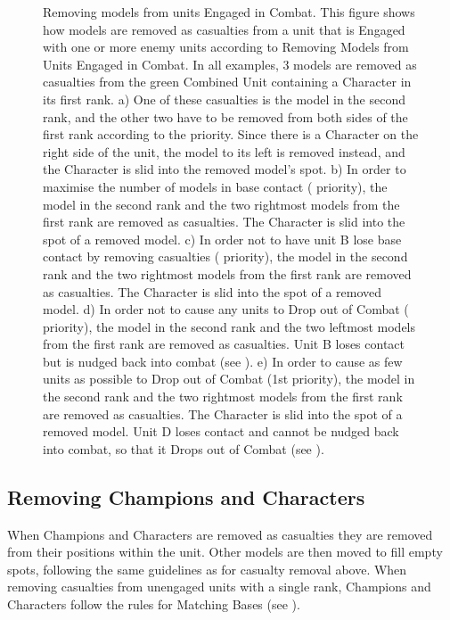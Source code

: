 \newcommand{\figRRMChar}{\fontsize{7}{8}\selectfont C}

\begin{figure}[!htbp]
	\renewcommand{\figbiglettersize}{16}
	\centering
	\begin{minipage}{0.55\textwidth}
	\def\svgwidth{\textwidth}
	
	\end{minipage}\hfill\begin{minipage}{0.43\textwidth}
	\caption{Removing \rnf{} models from units Engaged in Combat.\captionpar
	This figure shows how models are removed as casualties from a unit that is Engaged with one or more enemy units according to Removing \rnf{} Models from Units Engaged in Combat. In all examples, 3 models are removed as casualties from the green Combined Unit containing a Character in its first rank.\captionpar
	a) One of these casualties is the model in the second rank, and the other two have to be removed from both sides of the first rank according to the  priority. Since there is a Character on the right side of the unit, the \rnf{} model to its left is removed instead, and the Character is slid into the removed model's spot.\captionpar
	b) In order to maximise the number of models in base contact ( priority), the model in the second rank and the two rightmost \rnf{} models from the first rank are removed as casualties. The Character is slid into the spot of a removed \rnf{} model.\captionpar
	c) In order not to have unit B lose base contact by removing casualties ( priority), the model in the second rank and the two rightmost \rnf{} models from the first rank are removed as casualties. The Character is slid into the spot of a removed \rnf{} model.\captionpar
	d) In order not to cause any units to Drop out of Combat ( priority), the model in the second rank and the two leftmost \rnf{} models from the first rank are removed as casualties. Unit B loses contact but is nudged back into combat (see ).\captionpar
	e) In order to cause as few units as possible to Drop out of Combat (1st priority), the model in the second rank and the two rightmost \rnf{} models from the first rank are removed as casualties. The Character is slid into the spot of a removed \rnf{} model. Unit D loses contact and cannot be nudged back into combat, so that it Drops out of Combat (see ).\captionpar
	}
	\label{figure/removing_rnf_models}
	\end{minipage}
\end{figure}

 \subsection{Removing Champions and Characters}
 \label{removing_non_RnF_models}
 
When Champions and Characters are removed as casualties they are removed from their positions within the unit. Other models are then moved to fill empty spots, following the same guidelines as for casualty removal above. When removing casualties from unengaged units with a single rank, Champions and Characters follow the rules for Matching Bases (see ).
